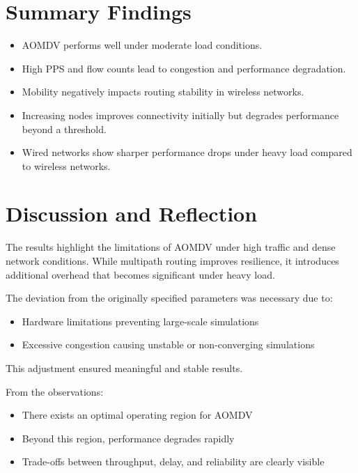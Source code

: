 \documentclass[11pt]{article}
\begin{document}
\section{Summary Findings}

\begin{itemize}
    \item AOMDV performs well under moderate load conditions.
    \item High PPS and flow counts lead to congestion and performance degradation.
    \item Mobility negatively impacts routing stability in wireless networks.
    \item Increasing nodes improves connectivity initially but degrades performance beyond a threshold.
    \item Wired networks show sharper performance drops under heavy load compared to wireless networks.
\end{itemize}

\section{Discussion and Reflection}

The results highlight the limitations of AOMDV under high traffic and dense network conditions. While multipath routing improves resilience, it introduces additional overhead that becomes significant under heavy load.

The deviation from the originally specified parameters was necessary due to:

\begin{itemize}
    \item Hardware limitations preventing large-scale simulations
    \item Excessive congestion causing unstable or non-converging simulations
\end{itemize}

This adjustment ensured meaningful and stable results.

From the observations:

\begin{itemize}
    \item There exists an optimal operating region for AOMDV
    \item Beyond this region, performance degrades rapidly
    \item Trade-offs between throughput, delay, and reliability are clearly visible
\end{itemize}
\end{document}
